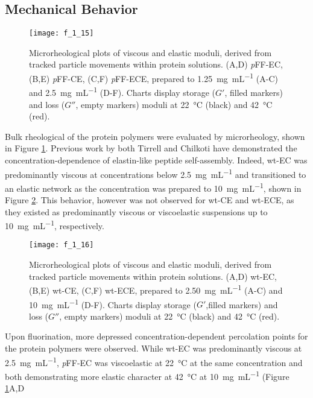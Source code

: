 \begin{refsection}
\subsection{Mechanical Behavior}
\begin{figure}[h!] \centering \texttt{[image: f\_1\_15]}
    \caption{Microrheological plots of viscous and elastic moduli, derived from
    tracked particle movements within protein solutions. (A,D) \emph{p}FF-EC, (B,E)
    \emph{p}FF-CE, (C,F) \emph{p}FF-ECE, prepared to \SI{1.25}{\mg\per\mL} (A-C) and
    \SI{2.5}{\mg\per\mL} (D-F). Charts display storage (${G'}$, filled markers) and loss
    (${G''}$, empty markers) moduli at \SI{22}{\celsius} (black) and \SI{42}{\celsius}
(red).} \label{fig:pFF_rheology} \end{figure}
Bulk rheological of the protein polymers were evaluated by microrheology, shown
in Figure \ref{fig:pFF_rheology}. Previous work by both Tirrell and Chilkoti
have demonstrated the concentration-dependence of elastin-like peptide
self-assembly.\cite{Meyer2004,Yamaoka2003} Indeed, wt-EC was predominantly
viscous at concentrations below \SI{2.5}{\mg\per\mL} and transitioned to an
elastic network as the concentration was prepared to \SI{10}{\mg\per\mL}, shown
in Figure \ref{fig:wt_rheology}.\cite{Haghpanah2010} This behavior, however was
not observed for wt-CE and wt-ECE, as they existed as predominantly viscous or
viscoelastic suspensions up to \SI{10}{\mg\per\mL}, respectively.
\begin{figure}[h!] \centering \texttt{[image: f\_1\_16]}
    \caption{Microrheological plots of viscous and elastic moduli, derived from
    tracked particle movements within protein solutions. (A,D) wt-EC, (B,E)
    wt-CE, (C,F) wt-ECE, prepared to \SI{2.50}{\mg\per\mL} (A-C) and
    \SI{10}{\mg\per\mL} (D-F). Charts display storage (${G'}$,filled markers) and loss
    (${G''}$, empty markers) moduli at \SI{22}{\celsius} (black) and \SI{42}{\celsius}
(red).} \label{fig:wt_rheology} \end{figure}
Upon fluorination, more depressed concentration-dependent percolation points for
the protein polymers were observed. While wt-EC was predominantly viscous at
\SI{2.5}{\mg\per\mL}, \emph{p}FF-EC was viscoelastic at \SI{22}{\celsius} at the
same concentration and both demonstrating more elastic character at
\SI{42}{\celsius} at \SI{10}{\mg\per\mL} (Figure \ref{fig:pFF_rheology}A,D

\end{refsection}
